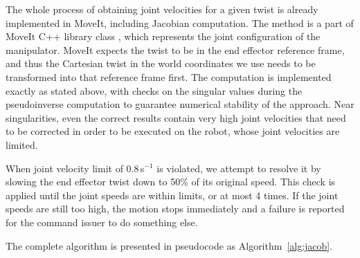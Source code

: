 \documentclass[buriama8_dp.tex]{subfiles}
\begin{document}
The whole process of obtaining joint velocities for a given twist is already implemented in MoveIt, including Jacobian computation. The method is a part of MoveIt C++ library class , which represents the joint configuration of the manipulator. MoveIt expects the twist to be in the end effector reference frame, and thus the Cartesian twist in the world coordinates we use needs to be transformed into that reference frame first. The computation is implemented exactly as stated above, with checks on the singular values during the pseudoinverse computation to guarantee numerical stability of the approach. Near singularities, even the correct results contain very high joint velocities that need to be corrected in order to be executed on the robot, whose joint velocities are limited.

When joint velocity limit of 0.8\,s\(^{-1}\) is violated, we attempt to resolve it by slowing the end effector twist down to 50\% of its original speed. This check is applied until the joint speeds are within limits, or at most 4 times. If the joint speeds are still too high, the motion stops immediately and a failure is reported for the command issuer to do something else.

The complete algorithm is presented in pseudocode as Algorithm~\ref{alg:jacob}.
\end{document}
